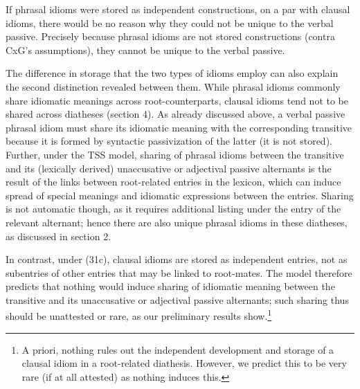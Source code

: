\documentclass[output=paper,
modfonts
]{LSP/langsci}
\begin{document}
If phrasal idioms were stored as independent constructions, on a par
with clausal idioms, there would be no reason why they could not be
unique to the verbal passive. Precisely because phrasal idioms are not
stored constructions (contra CxG's assumptions), they cannot be unique
to the verbal passive.

The difference in storage that the two types of idioms employ can also
explain the second distinction revealed between them. While phrasal
idioms commonly share idiomatic meanings across root-counterparts,
clausal idioms tend not to be shared across diatheses (section 4). As
already discussed above, a verbal passive phrasal idiom must share its
idiomatic meaning with the corresponding transitive because it is formed
by syntactic passivization of the latter (it is not stored). Further,
under the TSS model, sharing of phrasal idioms between the transitive
and its (lexically derived) unaccusative or adjectival passive
alternants is the result of the links between root-related entries in
the lexicon, which can induce spread of special meanings and idiomatic
expressions between the entries. Sharing is not automatic though, as it
requires additional listing under the entry of the relevant alternant;
hence there are also unique phrasal idioms in these diatheses, as
discussed in section 2.

In contrast, under (31c), clausal idioms are stored as independent
entries, not as subentries of other entries that may be linked to
root-mates. The model therefore predicts that nothing would induce
sharing of idiomatic meaning between the transitive and its unaccusative
or adjectival passive alternants; such sharing thus should be unattested
or rare, as our preliminary results show.\footnote{A priori, nothing
  rules out the independent development and storage of a clausal idiom
  in a root-related diathesis. However, we predict this to be very rare
  (if at all attested) as nothing induces this.}
\end{document}
